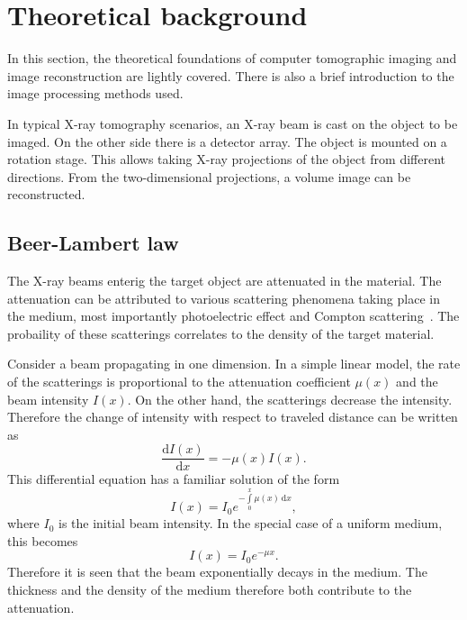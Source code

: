 \documentclass[a4paper,twoside,12pt]{article}
\begin{document}
\section{Theoretical background}
In this section, the theoretical foundations of computer tomographic imaging and image reconstruction are lightly covered. There is also a brief introduction to the image processing methods used.

In typical X-ray tomography scenarios, an X-ray beam is cast on the object to be imaged. On the other side there is a detector array. The object is mounted on a rotation stage. This allows taking X-ray projections of the object from different directions. From the two-dimensional projections, a volume image can be reconstructed.

\subsection{Beer-Lambert law}
The X-ray beams enterig the target object are attenuated in the material. The attenuation can be attributed to various scattering phenomena taking place in the medium, most importantly photoelectric effect and Compton scattering~\cite{lectures}. The probaility of these scatterings correlates to the density of the target material.

Consider a beam propagating in one dimension. In a simple linear model, the rate of the scatterings is proportional to the attenuation coefficient $\mu(x)$ and the beam intensity $I(x)$. On the other hand, the scatterings decrease the intensity. Therefore the change of intensity with respect to traveled distance can be written as
\begin{equation}
    \label{eq:bl_ode}
    \frac{\mathrm{d}I(x)}{\mathrm{d}x} = -\mu (x) I (x).
\end{equation}
This differential equation has a familiar solution of the form
\begin{equation}
    \label{eq:bl}
    I(x) = I_0 e ^ { -\int\limits_0^x \mu(x)\,\mathrm{d}x },
\end{equation}
where $I_0$ is the initial beam intensity. In the special case of a uniform medium, this becomes
\begin{equation}
    \label{eq:bl_linear}
    I(x) = I_0 e ^ { -\mu x }.
\end{equation}
Therefore it is seen that the beam exponentially decays in the medium. The thickness and the density of the medium therefore both contribute to the attenuation.
\end{document}
